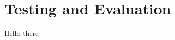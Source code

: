 \thispagestyle{plain}
\newpage
\section{Testing and Evaluation}\label{sec:testing-and-evaluation}

\normalsize

Hello there